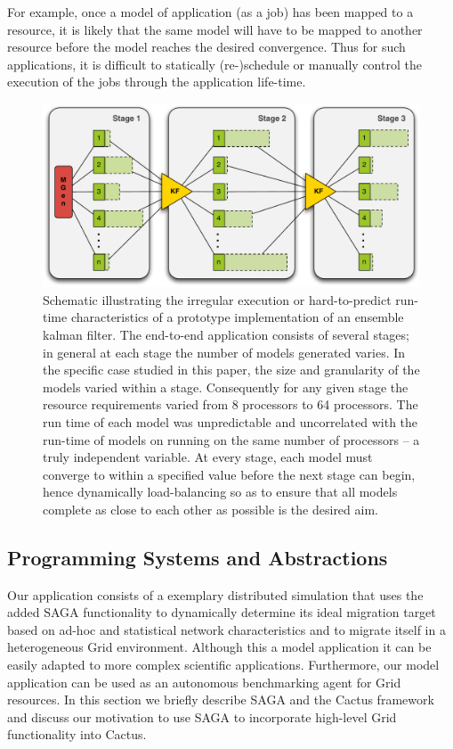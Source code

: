 \documentclass[conference,final]{IEEEtran}
\begin{document}
For example, once a model of application (as a job) has been mapped to
a resource, it is likely that the same model will have to be mapped to
another resource before the model reaches the desired convergence.
Thus for such applications, it is difficult to statically
(re-)schedule or manually control the execution of the jobs through
the application life-time.

\begin{figure}
\begin{center}
\includegraphics*[scale=0.36,]{./figures/3StageKalmanFilter}
\end{center}
\caption{Schematic illustrating the irregular execution or
  hard-to-predict run-time characteristics of a prototype
  implementation of an ensemble kalman filter. The end-to-end
  application consists of several stages; in general at each stage the
  number of models generated varies. In the specific case studied in
  this paper, the size and granularity of the models varied within a
  stage. Consequently for any given stage the resource requirements
  varied from 8 processors to 64 processors.  The run time of each
  model was unpredictable and uncorrelated with the run-time of models
  on running on the same number of processors -- a truly independent
  variable. At every stage, each model must converge to within a
  specified value before the next stage can begin, hence dynamically
  load-balancing so as to ensure that all models complete as close to
  each other as possible is the desired aim.}
\label{fig:irregular_execution}
\end{figure}

\subsection{Programming Systems and Abstractions}

Our application consists of a exemplary distributed simulation that
uses the added SAGA functionality to dynamically determine its ideal
migration target based on ad-hoc and statistical network
characteristics and to migrate itself in a heterogeneous Grid
environment.  Although this a model application it can be easily
adapted to more complex scientific applications.  Furthermore, our
model application can be used as an autonomous benchmarking agent for
Grid resources. In this section we briefly describe SAGA and the
Cactus framework and discuss our motivation to use SAGA to incorporate
high-level Grid functionality into Cactus.
\end{document}
